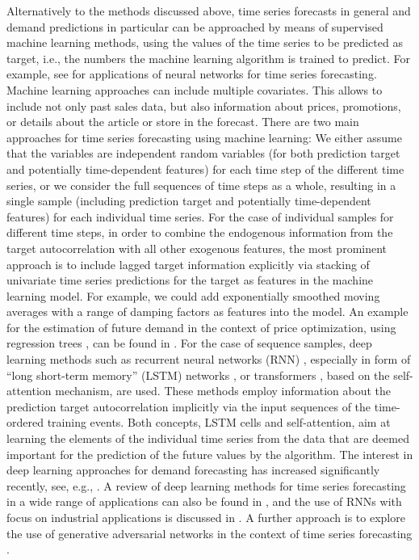\documentclass[BCOR=1mm, DIV=calc,10pt,
twoside=true,
twocolumn,
headings=normal]{scrartcl}
\begin{document}
Alternatively to the methods discussed above, time series forecasts in general and demand predictions in particular can be approached by means of supervised machine learning methods, using the values of the time series to be predicted as target, i.e., the numbers the machine learning algorithm is trained to predict.  For example, see \cite{Zhang2012,remus2001neural} for applications of neural networks for time series forecasting. Machine learning approaches can include multiple covariates. This allows to include not only past sales data, but also information about prices, promotions, or details about the article or store in the forecast. There are two main approaches for time series forecasting using  machine learning: We either assume that the variables are independent random variables (for both prediction target and potentially time-dependent features) for each time step of the different time series, or we consider the full sequences of time steps as a whole, resulting in a single sample (including prediction target and potentially time-dependent features) for each individual time series. For the case of individual samples for different time steps, in order to combine the endogenous information from the target autocorrelation with all other exogenous features, the most prominent approach is to include lagged target information explicitly via stacking of univariate time series predictions for the target as features in the machine learning model. For example, we could add exponentially smoothed moving averages with a range of damping factors as features into the model. An example for the estimation of future demand in the context of price optimization, using regression trees \cite{breiman1984}, can be found in \cite{ferreira2016analytics}. For the case of sequence samples, deep learning methods such as recurrent neural networks (RNN) \cite{rnn}, especially in form of ``long short-term memory'' (LSTM) networks \cite{hochreiter1997long}, or transformers \cite{transformer}, based on the self-attention mechanism, are used. These methods employ information about the prediction target autocorrelation implicitly via the input sequences of the time-ordered training events. Both concepts, LSTM cells and self-attention, aim at learning  the elements of the individual time series from the data that are deemed important for the prediction of the future values by the algorithm. The interest in deep learning approaches for demand forecasting has increased significantly recently, see, e.g., \cite{bandara2019sales,yu2017application, goyal2018solution,helmini2019sales, golkabek2020demand}. A review of deep learning methods for time series forecasting in a wide range of applications can also be found in \cite{langkvist2014review}, and the use of RNNs with focus on industrial applications is discussed in \cite{dixon2020industrial}. A further approach is to explore the use of generative adversarial networks \cite{goodfellow2014generative} in the context of time series forecasting \cite{haas2020statistical, ramponi2018t, smith2020conditional}. 
\end{document}
